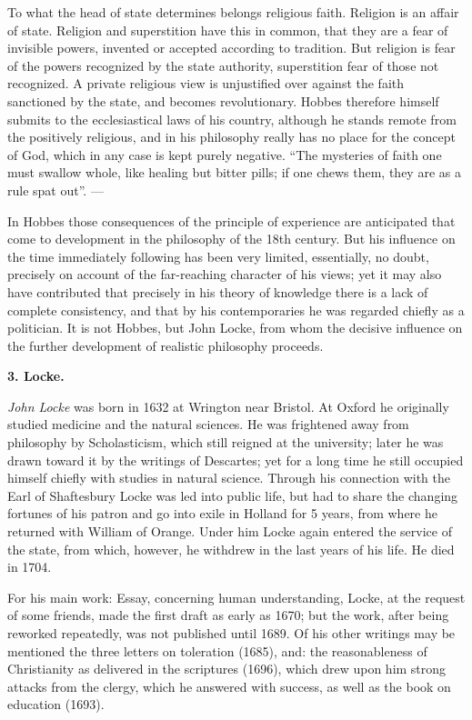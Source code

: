 To what the head of state determines belongs religious faith. Religion is an affair of state. Religion and superstition have this in common, that they are a fear of invisible powers, invented or accepted according to tradition. But religion is fear of the powers recognized by the state authority, superstition fear of those not recognized. A private religious view is unjustified over against the faith sanctioned by the state, and becomes revolutionary. Hobbes therefore himself submits to the ecclesiastical laws of his country, although he stands remote from the positively religious, and in his philosophy really has no place for the concept of God, which in any case is kept purely negative. ``The mysteries of faith one must swallow whole, like healing but bitter pills; if one chews them, they are as a rule spat out''. ---

In Hobbes those consequences of the principle of experience are anticipated that come to development in the philosophy of the 18th century. But his influence on the time immediately following has been very limited, essentially, no doubt, precisely on account of the far-reaching character of his views; yet it may also have contributed that precisely in his theory of knowledge there is a lack of complete consistency, and that by his contemporaries he was regarded chiefly as a politician. It is not Hobbes, but John Locke, from whom the decisive influence on the further development of realistic philosophy proceeds.

\divrule

\begin{center}
  \textbf{3. Locke.}
\end{center}

\emph{John Locke} was born in 1632 at Wrington near Bristol. At Oxford he originally studied medicine and the natural sciences. He was frightened away from philosophy by Scholasticism, which still reigned at the university; later he was drawn toward it by the writings of Descartes; yet for a long time he still occupied himself chiefly with studies in natural science. Through his connection with the Earl of Shaftesbury Locke was led into public life, but had to share the changing fortunes of his patron and go into exile in Holland for 5 years, from where he returned with William of Orange. Under him Locke again entered the service of the state, from which, however, he withdrew in the last years of his life. He died in 1704.

For his main work: Essay, concerning human understanding, Locke, at the request of some friends, made the first draft as early as 1670; but the work, after being reworked repeatedly, was not published until 1689. Of his other writings may be mentioned the three letters on toleration (1685), and: the reasonableness of Christianity as delivered in the scriptures (1696), which drew upon him strong attacks from the clergy, which he answered with success, as well as the book on education (1693).

